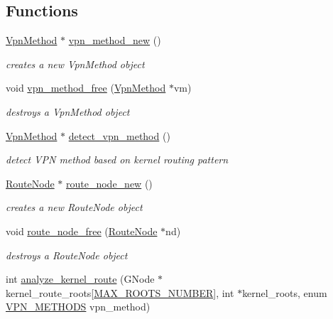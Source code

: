 \subsection*{Functions}
\begin{DoxyCompactItemize}
\item 
\hyperlink{route-tree_8h_a1034dd038389279bf422489d4d99d43a}{Vpn\+Method} $\ast$ \hyperlink{route-tree_8h_a3ccbf1b413fe282c1490701f739273a8}{vpn\+\_\+method\+\_\+new} ()
\begin{DoxyCompactList}\small\item\em creates a new Vpn\+Method object \end{DoxyCompactList}\item 
void \hyperlink{route-tree_8h_a24c2b4e2f6cd24a639b2fe63bb48f48e}{vpn\+\_\+method\+\_\+free} (\hyperlink{route-tree_8h_a1034dd038389279bf422489d4d99d43a}{Vpn\+Method} $\ast$vm)
\begin{DoxyCompactList}\small\item\em destroys a Vpn\+Method object \end{DoxyCompactList}\item 
\hyperlink{route-tree_8h_a1034dd038389279bf422489d4d99d43a}{Vpn\+Method} $\ast$ \hyperlink{route-tree_8h_a267529614de44218b8187f3ac46ce46f}{detect\+\_\+vpn\+\_\+method} ()
\begin{DoxyCompactList}\small\item\em detect V\+PN method based on kernel routing pattern \end{DoxyCompactList}\item 
\hyperlink{route-tree_8h_a1296be44c6672a1adb94ba6dc416682c}{Route\+Node} $\ast$ \hyperlink{route-tree_8h_a941ed51572db1d1d4720f8a329dd0d8b}{route\+\_\+node\+\_\+new} ()
\begin{DoxyCompactList}\small\item\em creates a new Route\+Node object \end{DoxyCompactList}\item 
void \hyperlink{route-tree_8h_a1b80d492072ee18f906bdd2fbaad9b4b}{route\+\_\+node\+\_\+free} (\hyperlink{route-tree_8h_a1296be44c6672a1adb94ba6dc416682c}{Route\+Node} $\ast$nd)
\begin{DoxyCompactList}\small\item\em destroys a Route\+Node object \end{DoxyCompactList}\item 
int \hyperlink{route-tree_8h_a5a490e2e29be18ae630572e3776539af}{analyze\+\_\+kernel\+\_\+route} (G\+Node $\ast$kernel\+\_\+route\+\_\+roots\mbox{[}\hyperlink{route-tree_8h_a8e1da3af3417de420798c8b448b6a8cb}{M\+A\+X\+\_\+\+R\+O\+O\+T\+S\+\_\+\+N\+U\+M\+B\+ER}\mbox{]}, int $\ast$kernel\+\_\+roots, enum \hyperlink{route-tree_8h_a5b876670828c4e38106ba1c6d91024b7}{V\+P\+N\+\_\+\+M\+E\+T\+H\+O\+DS} vpn\+\_\+method)

\end{DoxyCompactItemize}
